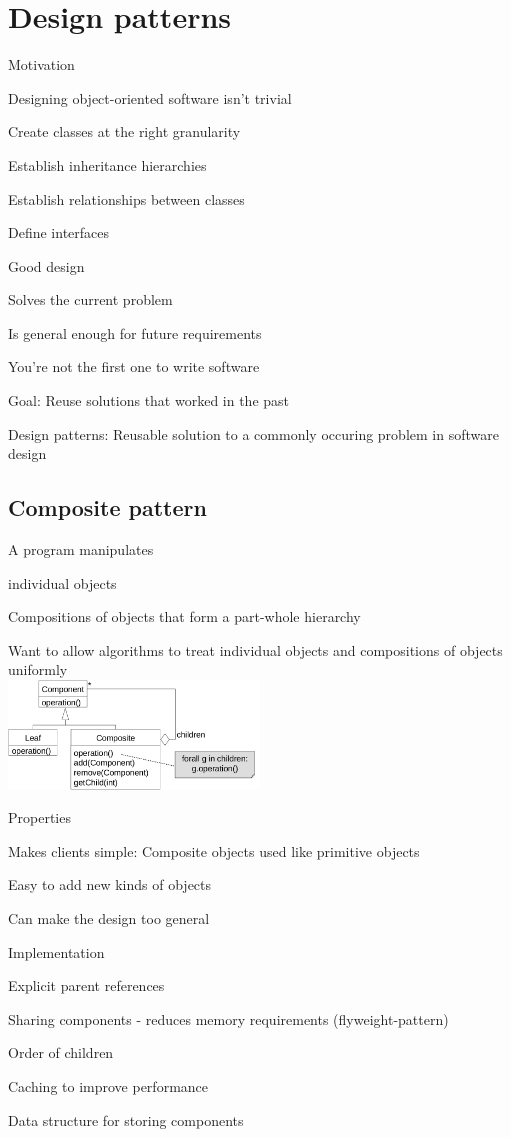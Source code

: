 \section{Design patterns}
\enumstart
	\item Motivation
	\enumstart
		\item Designing object-oriented software isn't trivial
		\enumstart
			\item Create classes at the right granularity
			\item Establish inheritance hierarchies
			\item Establish relationships between classes
			\item Define interfaces
		\enumend
		\item Good design
		\enumstart
			\item Solves the current problem
			\item Is general enough for future requirements
		\enumend
		\item You're not the first one to write software
		\item Goal: Reuse solutions that worked in the past
		\item Design patterns: Reusable solution to a commonly occuring problem in software design
	\enumend
\enumend

\subsection{Composite pattern}
\enumstart
	\item A program manipulates
	\enumstart
		\item individual objects
		\item Compositions of objects that form a part-whole hierarchy
	\enumend
	\item Want to allow algorithms to treat individual objects and compositions of objects uniformly
	\\ \includegraphics[width=0.5\textwidth]{img/composite_pattern.png}
	\item Properties
	\enumstart
		\item Makes clients simple: Composite objects used like primitive objects
		\item Easy to add new kinds of objects
		\item Can make the design too general
	\enumend
	\item Implementation
	\enumstart
		\item Explicit parent references
		\item Sharing components - reduces memory requirements (flyweight-pattern)
		\item Order of children
		\item Caching to improve performance
		\item Data structure for storing components
	\enumend
\enumend

